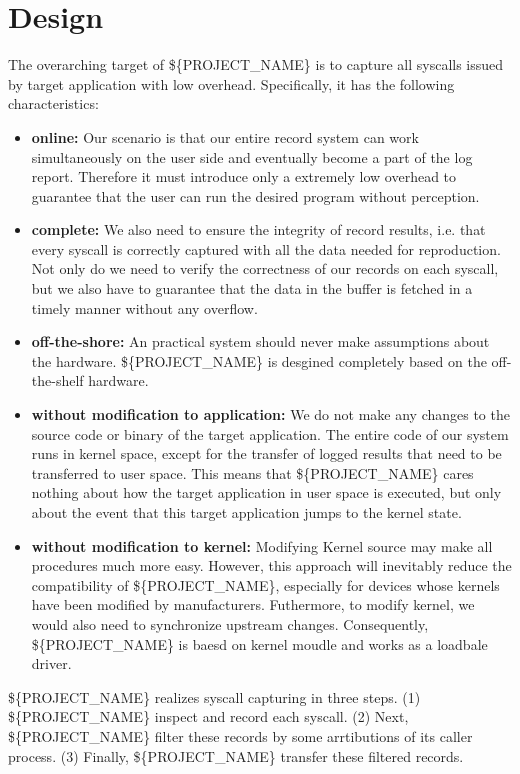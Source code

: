 \section{Design}
The overarching target of \$\{PROJECT\_NAME\} is to capture all syscalls issued by target application with low overhead. Specifically, it has the following characteristics:

\begin{itemize}
    \item \textbf{online:} Our scenario is that our entire record system can  work simultaneously on the user side and eventually become a part of the log report. Therefore it must introduce only a extremely low overhead to guarantee that the user can run the desired program without perception.
    \item \textbf{complete:} We also need to ensure the integrity of record results, i.e. that every syscall is correctly captured with all the data needed for reproduction. Not only do we need to verify the correctness of our records on each syscall, but we also have to guarantee that the data in the buffer is fetched in a timely manner without any overflow.
    \item \textbf{off-the-shore:} An practical system should never make assumptions about the hardware. \$\{PROJECT\_NAME\} is desgined completely based on the off-the-shelf hardware.
    \item \textbf{without modification to application:} We do not make any changes to the source code or binary of the target application. The entire code of our system runs in kernel space, except for the transfer of logged results that need to be transferred to user space. This means that \$\{PROJECT\_NAME\} cares nothing about how the target application in user space is executed, but only about the event that this target application jumps to the kernel state.
    \item \textbf{without modification to kernel:} Modifying Kernel source may make all procedures much more easy. However, this approach will inevitably reduce the compatibility of \$\{PROJECT\_NAME\}, especially for devices whose kernels have been modified by manufacturers. Futhermore, to modify kernel, we would also need to synchronize upstream changes. Consequently, \$\{PROJECT\_NAME\} is baesd on kernel moudle and works as a loadbale driver.
\end{itemize}


\$\{PROJECT\_NAME\} realizes syscall capturing in three steps. (1) \$\{PROJECT\_NAME\} inspect and record each syscall. (2) Next, \$\{PROJECT\_NAME\} filter these records by some arrtibutions of its caller process. (3) Finally, \$\{PROJECT\_NAME\} transfer these filtered records.




